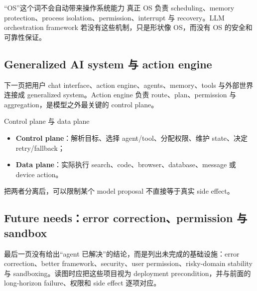 \begin{warningbox}{“OS”这个词不会自动带来操作系统能力}
真正 OS 负责 scheduling、memory protection、process isolation、permission、interrupt 与 recovery。LLM orchestration framework 若没有这些机制，只是形状像 OS，而没有 OS 的安全和可靠性保证。
\end{warningbox}

\subsection{Generalized AI system 与 action engine}

下一页把用户 chat interface、action engine、agents、memory、tools 与外部世界连接成 generalized system。Action engine 负责 route、plan、permission 与 aggregation，是模型之外最关键的 control plane。



\begin{importantbox}{Control plane 与 data plane}
\begin{itemize}
  \item \textbf{Control plane}：解析目标、选择 agent/tool、分配权限、维护 state、决定 retry/fallback；
  \item \textbf{Data plane}：实际执行 search、code、browser、database、message 或 device action。
\end{itemize}
把两者分离后，可以限制某个 model proposal 不直接等于真实 side effect。
\end{importantbox}

\subsection{Future needs：error correction、permission 与 sandbox}

最后一页没有给出“agent 已解决”的结论，而是列出未完成的基础设施：error correction、better framework、security、user permission、risky-domain stability 与 sandboxing。读图时应把这些项目视为 deployment precondition，并与前面的 long-horizon failure、权限和 side effect 逐项对应。


